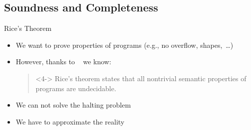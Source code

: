 \subsection{Soundness and Completeness}
\begin{frame}{Rice's Theorem}
   \begin{itemize}
      \itemsep12pt
      \item<2-> We want to prove properties of programs (e.g., no overflow, shapes,~\ldots)
      \item<3-> However, thanks to \citeauthor{rice1953classes}~\cite{rice1953classes} we know:\smallskip\\
      \begin{quote}<4->
         Rice's theorem states that all nontrivial semantic properties of programs are undecidable.~\cite[100]{cousout2021principles}
      \end{quote}
      \item<5-> We can not solve the halting problem
      \item<6-> We have to approximate the reality
   \end{itemize}
\end{frame}

